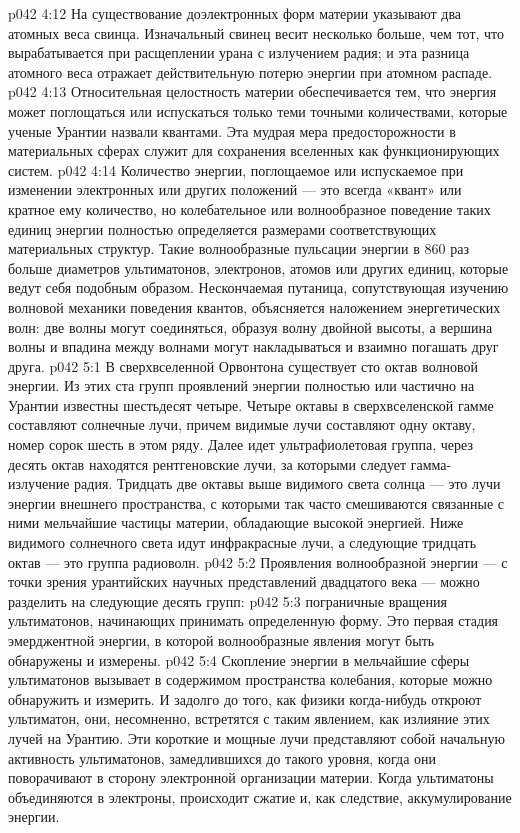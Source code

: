 \vs p042 4:12 \pc На существование доэлектронных форм материи указывают два атомных веса свинца. Изначальный свинец весит несколько больше, чем тот, что вырабатывается при расщеплении урана с излучением радия; и эта разница атомного веса отражает действительную потерю энергии при атомном распаде.
\vs p042 4:13 \pc Относительная целостность материи обеспечивается тем, что энергия может поглощаться или испускаться только теми точными количествами, которые ученые Урантии назвали квантами. Эта мудрая мера предосторожности в материальных сферах служит для сохранения вселенных как функционирующих систем.
\vs p042 4:14 Количество энергии, поглощаемое или испускаемое при изменении электронных или других положений --- это всегда «квант» или кратное ему количество, но колебательное или волнообразное поведение таких единиц энергии полностью определяется размерами соответствующих материальных структур. Такие волнообразные пульсации энергии в 860 раз больше диаметров ультиматонов, электронов, атомов или других единиц, которые ведут себя подобным образом. Нескончаемая путаница, сопутствующая изучению волновой механики поведения квантов, объясняется наложением энергетических волн: две волны могут соединяться, образуя волну двойной высоты, а вершина волны и впадина между волнами могут накладываться и взаимно погашать друг друга.
\vs p042 5:1 В сверхвселенной Орвонтона существует сто октав волновой энергии. Из этих ста групп проявлений энергии полностью или частично на Урантии известны шестьдесят четыре. Четыре октавы в сверхвселенской гамме составляют солнечные лучи, причем видимые лучи составляют одну октаву, номер сорок шесть в этом ряду. Далее идет ультрафиолетовая группа, через десять октав находятся рентгеновские лучи, за которыми следует гамма\hyp{}излучение радия. Тридцать две октавы выше видимого света солнца --- это лучи энергии внешнего пространства, с которыми так часто смешиваются связанные с ними мельчайшие частицы материи, обладающие высокой энергией. Ниже видимого солнечного света идут инфракрасные лучи, а следующие тридцать октав --- это группа радиоволн.
\vs p042 5:2 \pc Проявления волнообразной энергии --- с точки зрения урантийских научных представлений двадцатого века --- можно разделить на следующие десять групп:
\vs p042 5:3 \bibnobreakspace {} пограничные вращения ультиматонов, начинающих принимать определенную форму. Это первая стадия эмерджентной энергии, в которой волнообразные явления могут быть обнаружены и измерены.
\vs p042 5:4 \pc {}\bibnobreakspace {} Скопление энергии в мельчайшие сферы ультиматонов вызывает в содержимом пространства колебания, которые можно обнаружить и измерить. И задолго до того, как физики когда\hyp{}нибудь откроют ультиматон, они, несомненно, встретятся с таким явлением, как излияние этих лучей на Урантию. Эти короткие и мощные лучи представляют собой начальную активность ультиматонов, замедлившихся до такого уровня, когда они поворачивают в сторону электронной организации материи. Когда ультиматоны объединяются в электроны, происходит сжатие и, как следствие, аккумулирование энергии.
